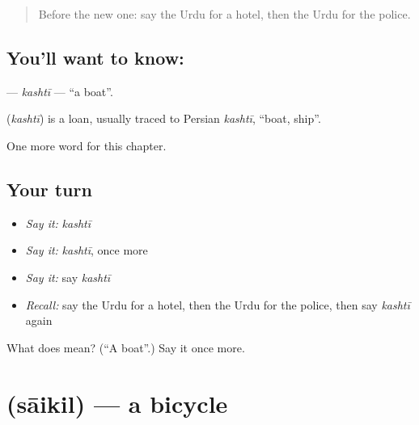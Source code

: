 \label{lesson:UR-C81-kashti}



\begin{quote}
Before the new one: say the Urdu for a hotel, then the Urdu for the police.
\end{quote}

\subsection*{You'll want to know: }
\textbf{} — \emph{kashtī} — \textquotedblleft{}a boat\textquotedblright{}.

\begin{cousinweb}
\textbf{} (\emph{kashtī}) is a loan, usually traced to Persian \emph{kashtī}, \textquotedblleft{}boat, ship\textquotedblright{}.
\end{cousinweb}

\begin{grammarlens}[title={What you've built}]
One more word for this chapter.
\end{grammarlens}

\subsection*{Your turn}
\begin{itemize}
\raggedright
  \item \emph{Say it:} \emph{kashtī}
  \item \emph{Say it:} \emph{kashtī}, once more
  \item \emph{Say it:} say \emph{kashtī}
  \item \emph{Recall:} say the Urdu for a hotel, then the Urdu for the police, then say \emph{kashtī} again
\end{itemize}

\begin{tcolorbox}[breakable,colback=teal!4,colframe=teal!35!black,title={Before you move on}]
What does  mean? (\textquotedblleft{}A boat\textquotedblright{}.) Say it once more.
\end{tcolorbox}
\section[\texorpdfstring{\ur{سائیکل} (sāikil)}{سائیکل (sāikil)}]{ (sāikil) — a bicycle}

\label{lesson:UR-C81-saikil}



